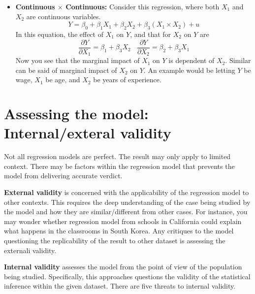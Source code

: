 \documentclass[12pt]{article}
\theoremstyle{definition}
\theoremstyle{property}
\theoremstyle{assumption}
\theoremstyle{example}
\theoremstyle{comment}
\begin{document}
\begin{itemize}
\item \textbf{Continuous $\times$ Continuous: } Consider this regression, where both $X_1$ and $X_2$ are continuous variables. 
\[
Y = \beta_0 + \beta_1X_1 + \beta_2 X_2 + \beta_3 (X_1\times X_2)+u
\] 
In this equation, the effect of $X_1$ on $Y$, and that for $X_2$ on $Y$ are
\[
\frac{\partial Y}{\partial X_1} = \beta_1 + \beta_3 X_2 \ \ \ \ \frac{\partial Y}{\partial X_2} = \beta_2 + \beta_3 X_1 
\]
Now you see that the marginal impact of $X_1$ on $Y$ is dependent of $X_2$. Similar can be said of marginal impact of $X_2$ on $Y$. An example would be letting $Y$ be wage, $X_1$ be age, and $X_2$ be years of experience. \par\medskip
\end{itemize}
\section{Assessing the model: Internal/exteral validity}
Not all regression models are perfect. The result may only apply to limited context. There may be factors within the regression model that prevents the model from delivering accurate verdict. \par\medskip
\textbf{External validity} is concerned with the applicability of the regression model to other contexts. This requires the deep understanding of the case being studied by the model and how they are similar/different from other cases. For instance, you may wonder whether regression model from schools in California could explain what happens in the classrooms in South Korea. Any critiques to the model questioning the replicability of the result to other dataset is assessing the externali validity. \par\medskip
\textbf{Internal validity} assesses the model from the point of view of the population being studied. Specifically, this approaches questions the validity of the statistical inference within the given dataset. There are five threats to internal validity.
\end{document}

